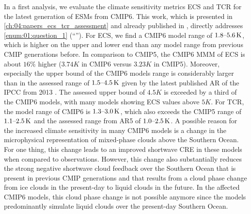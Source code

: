 In a first analysis, we evaluate the climate sensitivity metrics \ac{ECS} and
\ac{TCR} for the latest generation of \acp{ESM} from \acs{CMIP}6. This work,
which is presented in \cref{ch:04:papers_ecs_tcr_assessment} and already
published in \textcite{Bock2020, Meehl2020}, directly addresses
\cref{enum:01:question_1} (\enquote{\emph{\KeyScienceQuestionOne{}}}). For
\ac{ECS}, we find a \acs{CMIP}6 model range of $\rangeunit{1.8}{5.6}{K}$, which
is higher on the upper and lower end than any model range from previous
\ac{CMIP} generations before. In comparison to \acs{CMIP}5, the \acs{CMIP}6
\ac{MMM} of \ac{ECS} is about $16 \unit{\%}$ higher ($3.74 \unit{K}$ in
\acs{CMIP}6 versus $3.23 \unit{K}$ in \acs{CMIP}5). Moreover, especially the
upper bound of the \acs{CMIP}6 models range is considerably larger than in the
assessed range of $\rangeunit{1.5}{4.5}{K}$ given by the latest published
\ac{AR} of the \ac{IPCC} from 2013 \autocite{Stocker2013}. The assessed upper
bound of $4.5 \unit{K}$ is exceeded by a third of the \acs{CMIP}6 models, with
many models showing \ac{ECS} values above $5 \unit{K}$. For \ac{TCR}, the model
range of \acs{CMIP}6 is $\rangeunit{1.3}{3.0}{K}$, which also exceeds the
\acs{CMIP}5 range of $\rangeunit{1.1}{2.5}{K}$ and the assessed range from
\acs{AR}5 of $\rangeunit{1.0}{2.5}{K}$. A possible reason for the increased
climate sensitivity in many \acs{CMIP}6 models is a change in the microphysical
representation of mixed-phase clouds above the Southern Ocean. For one thing,
this change leads to an improved shortwave \ac{CRE} in these models when
compared to observations. However, this change also substantially reduces the
strong negative shortwave cloud feedback over the Southern Ocean that is
present in previous \ac{CMIP} generations and that results from a cloud phase
change from ice clouds in the present-day to liquid clouds in the future. In
the affected \acs{CMIP}6 models, this cloud phase change is not possible
anymore since the models predominantly simulate liquid clouds over the
present-day Southern Ocean.

